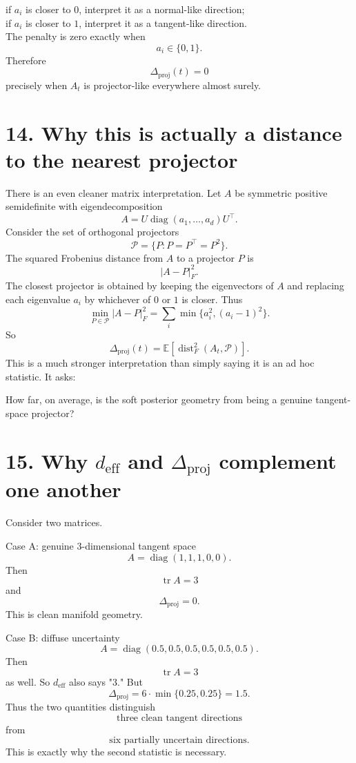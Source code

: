 \documentclass{article}
\begin{document}
if $a_i$ is closer to $0$, interpret it as a normal-like direction; \\
if $a_i$ is closer to $1$, interpret it as a tangent-like direction. \\
The penalty is zero exactly when
\[
a_i \in \{0,1\}.
\]
Therefore
\[
\boxed{
\Delta_{\mathrm{proj}}(t) = 0
}
\]
precisely when $A_t$ is projector-like everywhere almost surely.

\section*{14. Why this is actually a distance to the nearest projector}
There is an even cleaner matrix interpretation.
Let $A$ be symmetric positive semidefinite with eigendecomposition
\[
A = U\operatorname{diag}(a_1,\ldots,a_d)U^\top.
\]
Consider the set of orthogonal projectors
\[
\mathcal P = \{P : P=P^\top=P^2\}.
\]
The squared Frobenius distance from $A$ to a projector $P$ is
\[
|A-P|_F^2.
\]
The closest projector is obtained by keeping the eigenvectors of $A$ and replacing each eigenvalue $a_i$ by whichever of $0$ or $1$ is closer.
Thus
\[
\boxed{
\min_{P\in\mathcal P}|A-P|_F^2 = \sum_i \min\{a_i^2,(a_i-1)^2\}.
}
\]
So
\[
\boxed{
\Delta_{\mathrm{proj}}(t) = \mathbb E\left[ \operatorname{dist}_F^2(A_t,\mathcal P) \right].
}
\]
This is a much stronger interpretation than simply saying it is an ad hoc statistic.
It asks:

How far, on average, is the soft posterior geometry from being a genuine tangent-space projector?

\section*{15. Why $d_{\mathrm{eff}}$ and $\Delta_{\mathrm{proj}}$ complement one another}
Consider two matrices.

Case A: genuine 3-dimensional tangent space
\[
A = \operatorname{diag}(1,1,1,0,0).
\]
Then
\[
\operatorname{tr}A = 3
\]
and
\[
\Delta_{\mathrm{proj}} = 0.
\]
This is clean manifold geometry.

Case B: diffuse uncertainty
\[
A = \operatorname{diag}(0.5,0.5,0.5,0.5,0.5,0.5).
\]
Then
\[
\operatorname{tr}A = 3
\]
as well.
So $d_{\mathrm{eff}}$ also says "3."
But
\[
\Delta_{\mathrm{proj}} = 6\cdot\min\{0.25,0.25\} = 1.5.
\]
Thus the two quantities distinguish
\[
\text{three clean tangent directions}
\]
from
\[
\text{six partially uncertain directions}.
\]
This is exactly why the second statistic is necessary.
\end{document}
